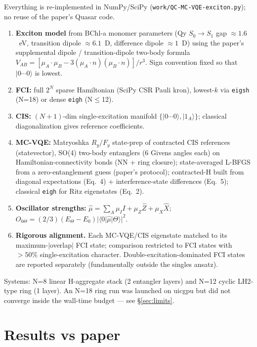 \documentclass[11pt]{article}
\begin{document}
Everything is re-implemented in NumPy/SciPy
(\texttt{work/QC-MC-VQE-exciton.py}); no reuse of the paper's Quasar code.
\begin{enumerate}
  \item \textbf{Exciton model} from BChl-a monomer parameters (Qy $S_0\to S_1$
        gap $\approx 1.6$~eV, transition dipole $\approx 6.1$~D, difference
        dipole $\approx 1$~D) using the paper's supplemental dipole /
        transition-dipole two-body formula
        $V_{AB} = [\mu_A\!\cdot\!\mu_B - 3(\mu_A\!\cdot\! n)(\mu_B\!\cdot\! n)]/r^3$.
        Sign convention fixed so that $|0\cdots 0\rangle$ is lowest.
  \item \textbf{FCI:} full $2^N$ sparse Hamiltonian (SciPy CSR Pauli kron),
        lowest-$k$ via \texttt{eigsh} (N=18) or dense \texttt{eigh} (N$\le$12).
  \item \textbf{CIS:} $(N+1)$-dim single-excitation manifold
        $\{|0\cdots 0\rangle, |1_A\rangle\}$; classical diagonalization gives
        reference coefficients.
  \item \textbf{MC-VQE:} Matryoshka $R_y/F_y$ state-prep of contracted CIS
        references (statevector), SO(4) two-body entanglers (6 Givens angles
        each) on Hamiltonian-connectivity bonds (NN + ring closure);
        state-averaged L-BFGS from a zero-entanglement guess (paper's
        protocol); contracted-H built from diagonal expectations (Eq.~4) +
        interference-state differences (Eq.~5); classical \texttt{eigh} for
        Ritz eigenstates (Eq.~2).
  \item \textbf{Oscillator strengths:}
        $\hat{\mu} = \sum_A \mu_I I + \mu_Z \hat{Z} + \mu_X \hat{X}$;
        $O_{0\Theta} = (2/3)(E_\Theta-E_0)|\langle 0|\hat{\mu}|\Theta\rangle|^2$.
  \item \textbf{Rigorous alignment.} Each MC-VQE/CIS eigenstate matched to its
        maximum-$|$overlap$|$ FCI state; comparison restricted to FCI states
        with $>50\%$ single-excitation character. Double-excitation-dominated
        FCI states are reported separately (fundamentally outside the singles
        ansatz).
\end{enumerate}

Systems: N=8 linear H-aggregate stack (2 entangler layers) and N=12 cyclic
LH2-type ring (1 layer). An N=18 ring run was launched on uicgpu but did not
converge inside the wall-time budget --- see \S\ref{sec:limits}.

\section{Results vs paper}
\end{document}
